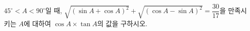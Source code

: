 $45^\circ<A<90^\circ$일 때, $\sqrt{(\sin A+\cos A)^2}+\sqrt{(\cos A-\sin A)^2}=\dfrac{30}{17}$을 만족시키는 $A$에 대하여 $\cos A\times\tan A$의 값을 구하시오.
